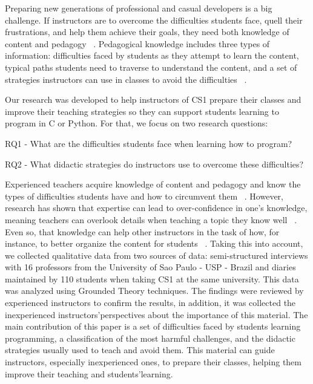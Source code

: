 \documentclass[sigconf]{acmart}
\begin{document}
Preparing new generations of professional and casual developers is a big challenge. If instructors are to overcome the difficulties students face, quell their frustrations, and help them achieve their goals, they need both knowledge of content and pedagogy ~\cite{Redish96,Shulman86,Shulman87}. Pedagogical knowledge includes three types of information: difficulties faced by students as they attempt to learn the content, typical paths students need to traverse to understand the content, and a set of strategies instructors can use in classes to avoid the difficulties ~\cite{Bransford00}. 

Our research was developed to help instructors of CS1 prepare their classes and improve their teaching strategies so they can support students learning to program in C or Python. For that, we focus on two research questions:

RQ1 - What are the difficulties students face when learning how to program?

RQ2 - What didactic strategies do instructors use to overcome these difficulties?

Experienced teachers acquire knowledge of content and pedagogy and know the types of difficulties students have and how to circumvent them  ~\cite{Bransford00}.  However, research has shown that expertise can lead to over-confidence in one\textquoteright s knowledge, meaning teachers can overlook details when teaching a topic they know well ~\cite{Fisher15}.  Even so, that knowledge can help other instructors in the task of how, for instance, to better organize the content for students ~\cite{Bransford00}. Taking  this into account, we collected qualitative data from two sources of data: semi-structured interviews with 16 professors from the University of Sao Paulo - USP - Brazil and diaries maintained by 110 students when taking CS1 at the same university. This data was analyzed using Grounded Theory techniques. The findings were reviewed by experienced instructors to confirm the results, in addition, it was collected the inexperienced instructors\textquoteright \space perspectives about the importance of this material. The main contribution of this paper is a set of difficulties faced by students learning programming, a classification of the most harmful challenges, and the didactic strategies usually used to teach and avoid them. This material can guide instructors, especially inexperienced ones, to prepare their classes, helping them improve their teaching and students\textquoteright \space learning.
\end{document}
